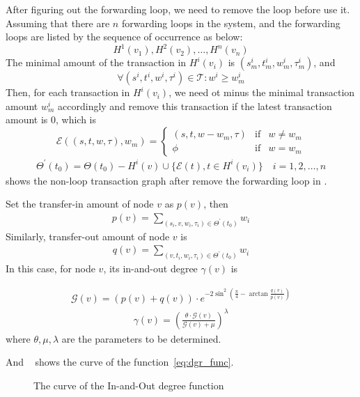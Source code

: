 After figuring out the forwarding loop, we need to remove the loop before use it. Assuming that there are $n$ forwarding loops in the system, and the forwarding loops are listed by the sequence of occurrence as below:
\[
H^1(v_1), H^2(v_2), \dots, H^n(v_n)\]
\noindent The minimal amount of the transaction in $H^i(v_i)$ is $(s^i_m, t^i_m, w^i_m, \tau^i_m)$, and
\[
\forall (s^i, t^i, w^i, \tau^i) \in \mathcal{T} : w^i \ge w^i_m
\]
\noindent Then, for each transaction in $H^i(v_i)$, we need ot minus the minimal transaction amount $w^i_m$ accordingly and remove this transaction if the latest transaction amount is 0, which is
\[
\mathcal{E}((s, t, w, \tau), w_m) = \left\{ \begin{array}{rcl}
(s, t, w-w_m, \tau) & \mbox{if} & w \ne w_m \\
\phi & \mbox{if} & w = w_m
\end{array}\right.
\]
\begin{align}
\Theta^{\prime}(t_0)=\Theta(t_0)-H^i(v) \cup \{\mathcal{E}(t), t\in H^i(v_i)\} \quad i = 1, 2,\dots, n
\end{align}
\noindent {} shows the non-loop transaction graph after remove the forwarding loop in .


Set the transfer-in amount of node $v$ as $p(v)$, then
\begin{align}
\label{eq:dgr_func}
p(v) = \sum_{(s_i, v, w_i, \tau_i) \in \Theta^{\prime}(t_0)}{w_i}
\end{align}
\noindent Similarly, transfer-out amount of node $v$ is
\begin{align}
q(v) = \sum_{(v, t_i, w_i, \tau_i) \in \Theta^{\prime}(t_0)}{w_i}
\end{align}
\noindent In this case,
for node $v$, its in-and-out degree $\gamma(v)$ is

\begin{align}
\mathcal{G}(v) = (p(v) + q(v)) \cdot e^{-2\sin^2{(\frac{\pi}{4} - \arctan\frac{q(v)}{p(v)})}}
\end{align}
\begin{align}
\gamma(v) = (\frac{\theta\cdot \mathcal{G}(v)}{\mathcal{G}(v) + \mu})^{\lambda}
\end{align}
\noindent where $\theta, \mu, \lambda$ are the parameters to be determined.


And ~ shows the curve of the function~\ref{eq:dgr_func}.
\begin{figure}
  \centering
  
\caption{The curve of the In-and-Out degree function \label{fig-surf}}
\end{figure}

